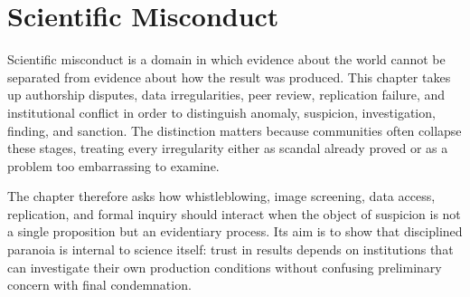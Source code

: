 
\chapter{Scientific Misconduct}
\label{ch:ch089}

Scientific misconduct is a domain in which evidence about the world cannot be separated from evidence about how the result was produced. This chapter takes up authorship disputes, data irregularities, peer review, replication failure, and institutional conflict in order to distinguish anomaly, suspicion, investigation, finding, and sanction. The distinction matters because communities often collapse these stages, treating every irregularity either as scandal already proved or as a problem too embarrassing to examine.

The chapter therefore asks how whistleblowing, image screening, data access, replication, and formal inquiry should interact when the object of suspicion is not a single proposition but an evidentiary process. Its aim is to show that disciplined paranoia is internal to science itself: trust in results depends on institutions that can investigate their own production conditions without confusing preliminary concern with final condemnation.
